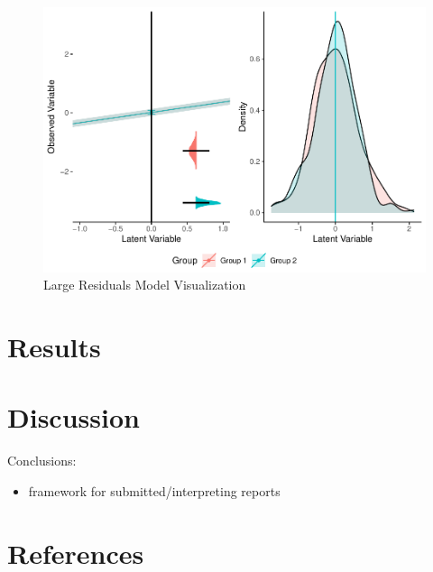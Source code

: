 \documentclass[
  man]{apa6}
\providecommand{\tightlist}{%
  \setlength{\itemsep}{0pt}\setlength{\parskip}{0pt}}
\begin{document}
\begin{figure}
\centering
\includegraphics{manuscript_files/figure-latex/large-res-pic-1.pdf}
\caption{\label{fig:large-res-pic}Large Residuals Model Visualization}
\end{figure}

\hypertarget{results}{%
\section{Results}\label{results}}

\hypertarget{discussion}{%
\section{Discussion}\label{discussion}}

Conclusions:

\begin{itemize}
\tightlist
\item
  framework for submitted/interpreting reports
\end{itemize}

\newpage

\hypertarget{references}{%
\section{References}\label{references}}
\end{document}
